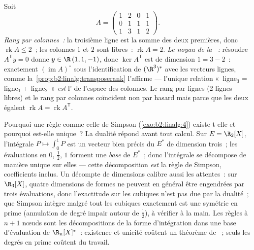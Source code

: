 \begin{example}\label{ex:b2:linalg:rankbothsides}
Soit
\[
A = \begin{pmatrix}
1 & 2 & 0 & 1\\
0 & 1 & 1 & 1\\
1 & 3 & 1 & 2
\end{pmatrix} .
\]
\emph{Rang par colonnes~:} la troisième ligne est la somme des deux
premières, donc $\operatorname{rk} A \leq 2$~; les colonnes $1$ et $2$
sont libres~: $\operatorname{rk} A = 2$. \emph{Le noyau de la
~:} résoudre $A^{\mathsf T}y = 0$ donne $y \in \R\,(1, 1, -1)$,
donc $\ker A^{\mathsf T}$ est de dimension $1 = 3 - 2$~: exactement
$(\operatorname{im} A)^\circ$ sous l'identification de
$(\R^3)^*$ avec les vecteurs lignes, comme
la~\cref{prop:b2:linalg:transposerank} l'affirme --- l'unique
relation «~ligne$_3$ = ligne$_1$ + ligne$_2$~» \emph{est}
l' de l'espace des colonnes. Le rang par lignes ($2$ lignes
libres) et le rang par colonnes coïncident non par hasard mais parce
que les deux égalent $\operatorname{rk} A = \operatorname{rk} A^{\mathsf T}$.
\end{example}

\begin{example}\label{ex:b2:linalg:quadratureread}
Pourquoi une règle comme celle de Simpson (\cref{exo:b2:linalg:4})
existe-t-elle et pourquoi est-elle unique~? La dualité répond avant
tout calcul. Sur $E = \R_2[X]$, l'intégrale $P \mapsto \int_0^1 P$ est
un vecteur bien précis du  $E^*$ de dimension trois~; les
évaluations en $0$, $\frac12$, $1$ forment une \emph{base} de
$E^*$~; donc l'intégrale se décompose de manière unique sur elles ---
cette décomposition \emph{est} la règle de Simpson, coefficients
inclus. Un décompte de dimensions calibre aussi les attentes~: sur
$\R_3[X]$, quatre dimensions de formes ne peuvent en général être
engendrées par trois évaluations, donc l'exactitude sur les cubiques
n'est pas due par la dualité~; que Simpson intègre malgré tout les
cubiques exactement est une symétrie en prime (annulation de degré
impair autour de $\frac12$), à vérifier à la main. Les règles à $n +
1$ nœuds sont les décompositions de la forme d'intégration dans une
base d'évaluation de $\R_n[X]^*$~: existence et unicité coûtent un
théorème de ~; seuls les degrés en prime coûtent du travail.
\end{example}

